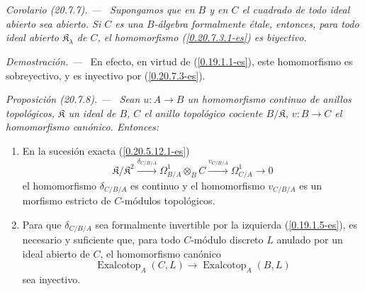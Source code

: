 \documentclass[10pt,oneside]{book}
\makeatletter
\newcommand{\sref}[1]{\textup{(\ref{#1})}}
\newcommand{\setmanualcurrentlabel}[1]{\def\@currentlabel{#1}}
\newenvironment{proposition}[1][]{%
  \setmanualcurrentlabel{#1}\par\medskip\noindent\itshape Proposición (#1). ---\ }{\par}
\newenvironment{corollary}[1][]{%
  \setmanualcurrentlabel{#1}\par\medskip\noindent\itshape Corolario (#1). ---\ }{\par}
\newenvironment{proof}{%
  \par\medskip\noindent\textit{Demostración. ---\ }}{\par}
\makeatother
\begin{document}
\begin{corollary}[20.7.7]
\label{0.20.7.7-es}
Supongamos que en $B$ y en $C$ el cuadrado de todo ideal abierto sea abierto.
Si $C$ es una $B$-álgebra formalmente étale, entonces, para todo ideal abierto
$\mathfrak K_\lambda$ de $C$, el homomorfismo \textup{\sref{0.20.7.3.1-es}} es
biyectivo.
\end{corollary}

\begin{proof}
En efecto, en virtud de \sref{0.19.1.1-es}, este homomorfismo es sobreyectivo, y
es inyectivo por \sref{0.20.7.3-es}.
\end{proof}

\begin{proposition}[20.7.8]
\label{0.20.7.8-es}
Sean $u:A\to B$ un homomorfismo continuo de anillos topológicos,
$\mathfrak K$ un ideal de $B$, $C$ el anillo topológico cociente
$B/\mathfrak K$, $v:B\to C$ el homomorfismo canónico. Entonces:
\begin{enumerate}
  \item[\rm(i)] En la sucesión exacta \textup{\sref{0.20.5.12.1-es}}
\[
  \mathfrak K/\mathfrak K^2\xrightarrow{\delta_{C/B/A}}
  \Omega^1_{B/A}\otimes_B C\xrightarrow{v_{C/B/A}}\Omega^1_{C/A}\to0
\]
el homomorfismo $\delta_{C/B/A}$ es continuo y el homomorfismo $v_{C/B/A}$
es un morfismo estricto de $C$-módulos topológicos.
  \item[\rm(ii)] Para que $\delta_{C/B/A}$ sea formalmente invertible por la
izquierda \textup{\sref{0.19.1.5-es}}, es necesario y suficiente que, para todo $C$-módulo
discreto $L$ anulado por un ideal abierto de $C$, el homomorfismo canónico
\begin{equation}
\tag{20.7.8.1}
\label{0.20.7.8.1-es}
  \operatorname{Exalcotop}_A(C,L)\to\operatorname{Exalcotop}_A(B,L)
\end{equation}
sea inyectivo.
\end{enumerate}
\end{proposition}
\end{document}
